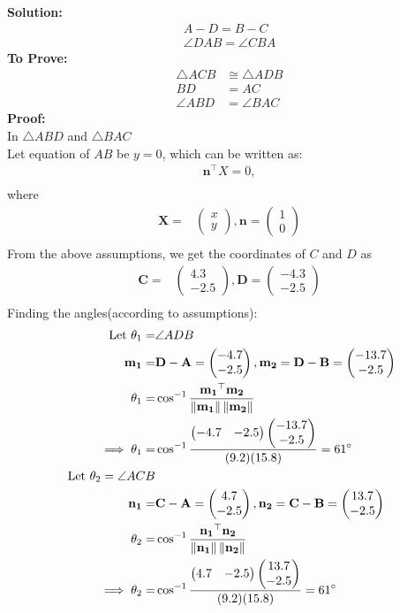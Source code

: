 \documentclass{article}
\providecommand{\norm}[1]{\left\lVert#1\right\rVert}
\newcommand{\solution}{\noindent \textbf{Solution: }}
\newcommand{\myvec}[1]{\ensuremath{\begin{pmatrix}#1\end{pmatrix}}}
\let\vec\mathbf
\begin{document}
\solution
\begin{align}
  A-D = B-C\\
  \angle{DAB} = \angle{CBA}
\end{align}
\textbf{To Prove:}
  \begin{align}
	  \triangle{ACB} &\cong \triangle{ADB}\\
	  BD &= AC\\
	  \angle{ABD} &= \angle{BAC}
  \end{align}
\textbf{Proof:}\\
In $\triangle{ABD}$ and $\triangle{BAC}$\\
Let  equation of $AB$ be $y = 0$, which can be written as:
\begin{align}
\vec{n}^{\top}X = 0,\\
\end{align}
where
\begin{align}
\vec{X} =& \myvec{x\\y},\vec{n} = \myvec{1\\0}\\
\end{align}
  From the above assumptions, we get the coordinates of $C$ and $D$ as
  \begin{align}
\vec{C} =& \myvec{4.3\\-2.5},\vec{D} = \myvec{-4.3\\-2.5}\\
  \end{align}
    Finding the angles(according to assumptions):
    \begin{align}
\text{Let }\theta_1=&\angle ADB\\
\vec{m_1}=&\vec{D}-\vec{A}=\myvec{-4.7\\-2.5}, \vec{m_2}=\vec{D}-\vec{B}=\myvec{-13.7\\-2.5}\\
\theta_1=&\cos^{-1}\frac{\vec{m_1}^\top\vec{m_2}}{\norm{\vec{m_1}}\norm{\vec{m_2}}}\\
\implies\theta_1=&\cos^{-1}\frac{\myvec{-4.7&-2.5}\myvec{-13.7\\-2.5}}{(9.2)(15.8)}=61\degree 
\label{eq:1}\\
\text{ Let }\theta_2=\angle ACB\\
\vec{n_1}=&\vec{C}-\vec{A}=\myvec{4.7\\-2.5}, \vec{n_2}=\vec{C}-\vec{B}=\myvec{13.7\\-2.5}\\
\theta_2 =& \cos^{-1}\frac{\vec{n_1}^\top\vec{n_2}}{\norm{\vec{n_1}}\norm{\vec{n_2}}}\\
\implies\theta_2=&\cos^{-1}\frac{\myvec{4.7&-2.5}\myvec{13.7\\-2.5}}{(9.2)(15.8)}=61\degree 
\label{eq:2}
\end{align}
\end{document}
